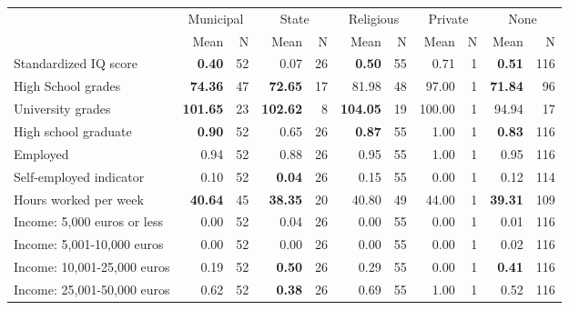 \begin{tabular}{l r r r r r r r r r r}
\toprule
& \multicolumn{2}{c}{Municipal} & \multicolumn{2}{c}{State} & \multicolumn{2}{c}{Religious} & \multicolumn{2}{c}{Private} & \multicolumn{2}{c}{None} \\
& \scriptsize Mean & \scriptsize N & \scriptsize Mean & \scriptsize N & \scriptsize Mean & \scriptsize N & \scriptsize Mean & \scriptsize N & \scriptsize Mean & \scriptsize N \\
\midrule
Standardized IQ score & \textbf{     0.40} &        52 &      0.07 &        26 & \textbf{     0.50} &        55 &      0.71 &         1 & \textbf{     0.51} &       116 \\
High School grades & \textbf{    74.36} &        47 & \textbf{    72.65} &        17 &     81.98 &        48 &     97.00 &         1 & \textbf{    71.84} &        96 \\
University grades & \textbf{   101.65} &        23 & \textbf{   102.62} &         8 & \textbf{   104.05} &        19 &    100.00 &         1 &     94.94 &        17 \\
High school graduate & \textbf{     0.90} &        52 &      0.65 &        26 & \textbf{     0.87} &        55 &      1.00 &         1 & \textbf{     0.83} &       116 \\
Employed &      0.94 &        52 &      0.88 &        26 &      0.95 &        55 &      1.00 &         1 &      0.95 &       116 \\
Self-employed indicator &      0.10 &        52 & \textbf{     0.04} &        26 &      0.15 &        55 &      0.00 &         1 &      0.12 &       114 \\
Hours worked per week & \textbf{    40.64} &        45 & \textbf{    38.35} &        20 &     40.80 &        49 &     44.00 &         1 & \textbf{    39.31} &       109 \\
Income: 5,000 euros or less &      0.00 &        52 &      0.04 &        26 &      0.00 &        55 &      0.00 &         1 &      0.01 &       116 \\
Income: 5,001-10,000 euros &      0.00 &        52 &      0.00 &        26 &      0.00 &        55 &      0.00 &         1 &      0.02 &       116 \\
Income: 10,001-25,000 euros &      0.19 &        52 & \textbf{     0.50} &        26 &      0.29 &        55 &      0.00 &         1 & \textbf{     0.41} &       116 \\
Income: 25,001-50,000 euros &      0.62 &        52 & \textbf{     0.38} &        26 &      0.69 &        55 &      1.00 &         1 &      0.52 &       116 \\

\end{tabular}
